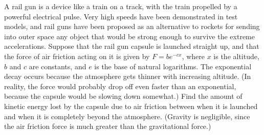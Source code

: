  A rail gun is a device like a train on a track, with
the train propelled by a powerful electrical pulse. Very
high speeds have been demonstrated in test models, and rail
guns have been proposed as an alternative to rockets for
sending into outer space any object that would be strong
enough to survive the extreme accelerations. Suppose that
the rail gun capsule is launched straight up, and that the
force of air friction acting on it is given by 
$F=be^{-cx}$, where $x$ is the altitude, $b$ and $c$ are
constants, and $e$ is the base of natural logarithms. The
exponential decay occurs because the atmosphere gets thinner
with increasing altitude. (In reality, the force would
probably drop off even faster than an exponential, because
the capsule would be slowing down somewhat.) Find the amount
of kinetic energy lost by the capsule due to air friction
between when it is launched and when it is completely beyond
the atmosphere. (Gravity is negligible, since the air
friction force is much greater than the gravitational force.)
\answercheck
